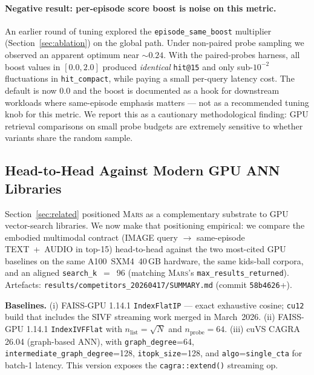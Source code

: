 \documentclass[11pt]{article}
\newcommand{\mars}{\textsc{Mars}}
\begin{document}
\paragraph{Negative result: per-episode score boost is noise on this
metric.} An earlier round of tuning explored the
\texttt{episode\_same\_boost} multiplier
(Section~\ref{sec:ablation}) on the global path. Under
non-paired probe sampling we observed an apparent optimum near
${\sim}0.24$. With the paired-probes harness, all boost values in
$[0.0, 2.0]$ produced \emph{identical} \texttt{hit@15} and only
sub-$10^{-2}$ fluctuations in \texttt{hit\_compact}, while paying
a small per-query latency cost. The default is now $0.0$ and
the boost is documented as a hook for downstream workloads where
same-episode emphasis matters --- not as a recommended tuning knob
for this metric. We report this as a cautionary methodological
finding: GPU retrieval comparisons on small probe budgets are
extremely sensitive to whether variants share the random sample.

\subsection{Head-to-Head Against Modern GPU ANN Libraries}
\label{sec:competitor_bench}

Section~\ref{sec:related} positioned \mars{} as a complementary
substrate to GPU vector-search libraries. We now make that
positioning empirical: we compare the embodied multimodal contract
(IMAGE query $\to$ same-episode TEXT~+~AUDIO in top-15) head-to-head
against the two most-cited GPU baselines on the same A100~SXM4~40\,GB
hardware, the same kids-ball corpora, and an aligned
\texttt{search\_k}~$=$~96 (matching \mars's
\texttt{max\_results\_returned}). Artefacts:
\texttt{results/competitors\_20260417/SUMMARY.md} (commit
\texttt{58b4626}+).

\textbf{Baselines.}
(i) FAISS-GPU 1.14.1 \texttt{IndexFlatIP} --- exact exhaustive
cosine; \texttt{cu12} build that includes the SIVF streaming work
merged in March~2026.
(ii) FAISS-GPU 1.14.1 \texttt{IndexIVFFlat} with
$n_{\text{list}}{=}\sqrt{N}$ and $n_{\text{probe}}{=}64$.
(iii) cuVS CAGRA 26.04 (graph-based ANN), with
\texttt{graph\_degree}{=}64,
\texttt{intermediate\_graph\_degree}{=}128,
\texttt{itopk\_size}{=}128, and
\texttt{algo}{=}\texttt{single\_cta} for batch-1 latency. This
version exposes the \texttt{cagra::extend()} streaming op.
\end{document}
